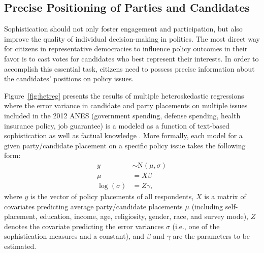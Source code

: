 \documentclass[12pt]{article}
\begin{document}
\subsection*{Precise Positioning of Parties and Candidates}

Sophistication should not only foster engagement and participation, but also improve the quality of individual decision-making in politics. The most direct way for citizens in representative democracies to influence policy outcomes in their favor is to cast votes for candidates who best represent their interests. In order to accomplish this essential task, citizens need to possess precise information about the candidates' positions on policy issues.

Figure~\ref{fig:hetreg} presents the results of multiple heteroskedastic regressions where the error variance in candidate and party placements on multiple issues included in the 2012 ANES (government spending, defense spending, health insurance policy, job guarantee) is a modeled as a function of text-based sophistication as well as factual knowledge \citep[see][for a similar procedure]{jacoby2006value}. More formally, each model for a given party/candidate placement on a specific policy issue takes the following form:
\begin{align}
y &\sim \text{N}(\mu, \sigma) \\
\mu &= X\beta \\
\log(\sigma) &= Z\gamma,
\end{align}
where $y$ is the vector of policy placements of all respondents, $X$ is a matrix of covariates predicting average party/candidate placements $\mu$ (including self-placement, education, income, age, religiosity, gender, race, and survey mode), $Z$ denotes the covariate predicting the error variances $\sigma$ (i.e., one of the sophistication measures and a constant), and $\beta$ and $\gamma$ are the parameters to be estimated.
\end{document}
